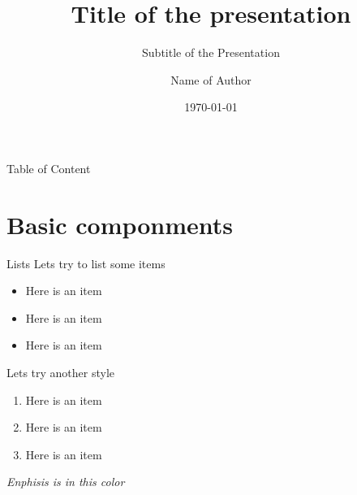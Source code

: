 \documentclass{libs/SUSTech_format}
\title[short title of the pre]{\huge\textbf{Title of the presentation}}
\subtitle{Subtitle of the Presentation}
\author{Name of Author}
\institute[SUSTech]{
    \normalsize{\email{name@mail.sustech.edu.cn}}
    \newline
    \department{Name of the Department}
    \newline
    \SUSTech
}
\date{\today}
\begin{document}


\begin{frame}{}
    \maketitle
\end{frame}

\begin{frame}{Table of Content}
    \begin{multicols}{2}
        \tableofcontents
    \end{multicols}
\end{frame}

\section{Basic componments}

\begin{frame}{Lists}
    Lets try to list some items
    \begin{itemize}
        \item Here is an item
        \item Here is an item
        \item Here is an item
    \end{itemize}

    \vspace{0.4cm} %
    
    Lets try another style
    \begin{enumerate}
        \item Here is an item
        \item Here is an item
        \item Here is an item
    \end{enumerate}

    \vspace{0.2cm}

     \emph{Enphisis is in this color}
\end{frame}

\end{document}
